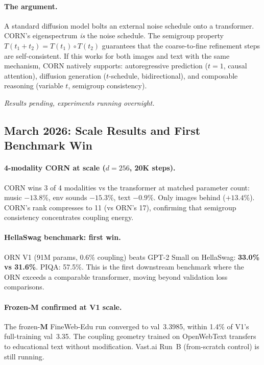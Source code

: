 \documentclass[11pt, a4paper]{article}
\newcommand{\M}{\mathbf{M}}
\theoremstyle{remark}
\begin{document}
\paragraph{The argument.}
A standard diffusion model bolts an external noise schedule onto a transformer.
CORN's eigenspectrum \emph{is} the noise schedule.
The semigroup property $T(t_1 + t_2) = T(t_1) \circ T(t_2)$ guarantees that the coarse-to-fine refinement steps are self-consistent.
If this works for both images and text with the same mechanism, CORN natively supports:
autoregressive prediction ($t{=}1$, causal attention),
diffusion generation ($t$-schedule, bidirectional),
and composable reasoning (variable $t$, semigroup consistency).

\medskip
\noindent\textit{Results pending, experiments running overnight.}

\subsection{March 2026: Scale Results and First Benchmark Win}

\paragraph{4-modality CORN at scale ($d{=}256$, 20K steps).}
CORN wins 3 of 4 modalities vs the transformer at matched parameter count: music $-13.8\%$, env sounds $-15.3\%$, text $-0.9\%$. Only images behind ($+13.4\%$). CORN's rank compresses to 11 (vs ORN's 17), confirming that semigroup consistency concentrates coupling energy.

\paragraph{HellaSwag benchmark: first win.}
ORN V1 (91M params, 0.6\% coupling) beats GPT-2 Small on HellaSwag: \textbf{33.0\% vs 31.6\%}. PIQA: 57.5\%. This is the first downstream benchmark where the ORN exceeds a comparable transformer, moving beyond validation loss comparisons.

\paragraph{Frozen-M confirmed at V1 scale.}
The frozen-$\M$ FineWeb-Edu run converged to val~3.3985, within 1.4\% of V1's full-training val~3.35. The coupling geometry trained on OpenWebText transfers to educational text without modification. Vast.ai Run~B (from-scratch control) is still running.
\end{document}
